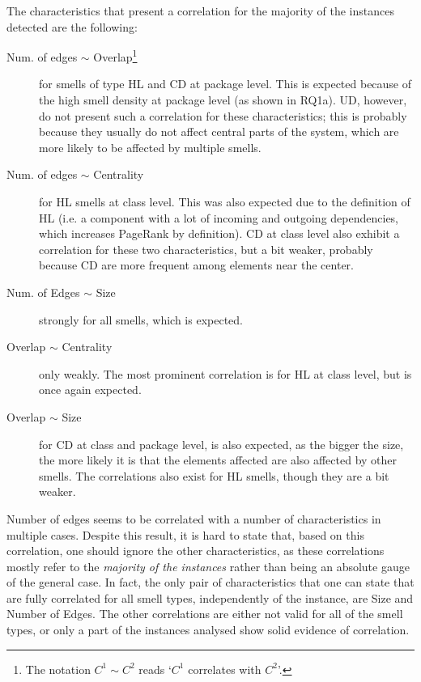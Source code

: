 The characteristics that present a correlation for the majority of the instances detected are the following:
\begin{description}
    \item[Num. of edges $\sim$ Overlap\footnote{The notation $C^1 \sim C^2$ reads `$C^1$ correlates with $C^2$'.}] for smells of type HL and CD at package level. This is expected because of the high smell density at package level (as shown in RQ1a).
    UD, however, do not present such a correlation for these characteristics; this is probably because they usually do not affect central parts of the system, which are more likely to be affected by multiple smells.

    \item[Num. of edges $\sim$ Centrality] for HL smells at class level.
    This was also expected due to the definition of HL (i.e. a component with a lot of incoming and outgoing dependencies, which increases PageRank by definition).
    CD at class level also exhibit a correlation for these two characteristics, but a bit weaker, probably because CD are more frequent among elements near the center.

    \item[Num. of Edges $\sim$ Size] strongly for all smells, which is expected.
    
    \item[Overlap $\sim$ Centrality] only weakly. The most prominent correlation is for HL at class level, but is once again expected.
    
    \item[Overlap $\sim$ Size] for CD at class and package level, is also expected, as the bigger the size, the more likely it is that the elements affected are also affected by other smells. The correlations also exist for HL smells, though they are a bit weaker.
          
\end{description}

Number of edges seems to be correlated with a number of characteristics in multiple cases. Despite this result, it is hard to state that, based on this correlation, one should ignore the other characteristics, as these correlations mostly refer to the \textit{majority of the instances} rather than being an absolute gauge of the general case.
In fact, the only pair of characteristics that one can state that are fully correlated for all smell types, independently of the instance, are Size and Number of Edges.
The other correlations are either not valid for all of the smell types, or only a part of the instances analysed show solid evidence of correlation. 

